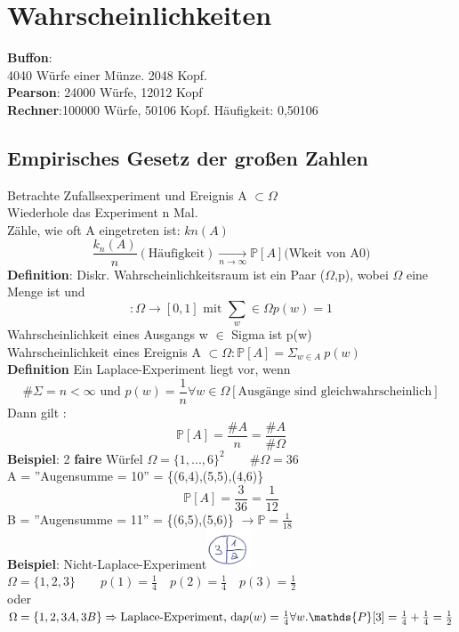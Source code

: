\section{Wahrscheinlichkeiten}
\textbf{Buffon}:\\
4040 Würfe einer Münze. 2048 Kopf.\medskip\\
\textbf{Pearson}: 24000 Würfe, 12012 Kopf\medskip\\
\textbf{Rechner}:100000 Würfe, 50106 Kopf. Häufigkeit: 0,50106\\
\subsection{Empirisches Gesetz der großen Zahlen}
Betrachte Zufallsexperiment und Ereignis A $\subset \Omega$\\
Wiederhole das Experiment n Mal.\\
Zähle, wie oft A eingetreten ist: $kn(A)$ $$\frac{k_n(A)}{n} (\text{Häufigkeit}) \underset{n\rightarrow \infty}{\rightarrow} \mathds {P}[A] \text{(Wkeit von A0)}$$ 
\textbf{Definition}: Diskr. Wahrscheinlichkeitsraum ist ein Paar ($\Omega$,p), wobei $\Omega$ eine Menge ist und
$$:\Omega \rightarrow [0,1] \text{ mit } \sum_w\in \Omega p(w) = 1$$
Wahrscheinlichkeit eines Ausgangs w $\in$ Sigma ist p(w)\\
Wahrscheinlichkeit eines Ereignis A $\subset \Omega : \mathds {P}[A]=\Sigma_{w\in A}\:p(w)$\medskip\\
\textbf{Definition} Ein Laplace-Experiment liegt vor, wenn 
$$\#\Sigma = n < \infty \text{ und } p(w) = \frac{1}{n}\forall w \in \Omega[\text{Ausgänge sind gleichwahrscheinlich}]$$
Dann gilt : $$\mathds {P}[A]=\frac{\#A}{n}= \frac{\#A}{\#\Omega}$$
\textbf{Beispiel}: 2 \textbf{faire} Würfel $\Omega = \{1,...,6\}^2 \qquad \#\Omega = 36$\\
A = ''Augensumme  = 10'' = \{(6,4),(5,5),(4,6)\}
$$\mathds {P}[A] = \frac{3}{36}=\frac{1}{12}$$
B = ''Augensumme = 11'' = \{(6,5),(5,6)\} $\rightarrow \mathds {P}=\frac{1}{18}$\medskip\\
\textbf{Beispiel}: Nicht-Laplace-Experiment\includegraphics[width=0.1\textwidth]{img/torte.PNG}\\
$\Omega = \{1,2,3\} \qquad p(1) = \frac{1}{4} \quad p(2)=\frac{1}{4} \quad p(3) = \frac{1}{2}$\\oder
$\Omega = \{1,2,3A,3B\} \Rightarrow \text{Laplace-Experiment, da} \\ p(w) = \frac{1}{4} \forall w. \mathds {P}[3] = \frac{1}{4}+\frac{1}{4} = \frac{1}{2}$\medskip\\

